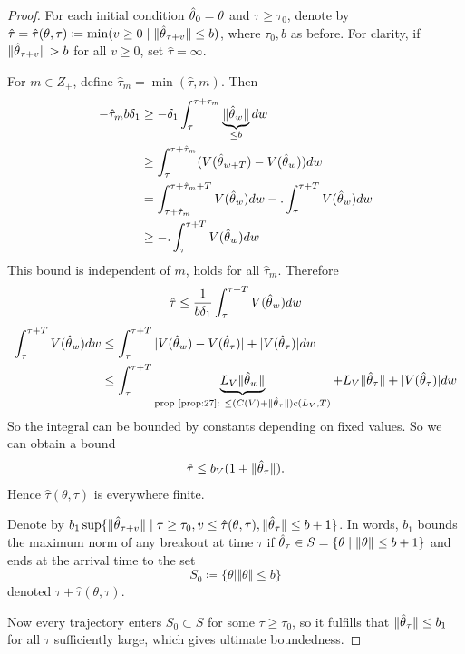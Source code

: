 \begin{proof}
    For each initial condition \({\hat{\theta}}_0=\theta\) and \(\tau\geq \tau_0\), denote by 
    \(\hat{\tau}=\hat{\tau}(\theta,\tau)\coloneqq \min(v\geq 0\mid \Vert {\hat{\theta}}_{\tau+v}\Vert \leq b)\),
    where \(\tau_0,b\) as before. For clarity, if \(\Vert{\hat{\theta}}_{\tau+v}\Vert>b\)
    for all \(v\geq 0\), set \(\hat{\tau}=\infty\).

    For \(m\in Z_+\), define \(\hat{\tau}_m=\min(\hat{\tau},m)\). Then 
    \begin{align*}
        -\hat{\tau}_m b\delta_1&\geq -\delta_1\int_\tau^{\tau+\tau_m}\underbrace{\Vert {\hat{\theta}}_w\Vert}_{\leq b} dw\\
        &\geq \int_\tau^{\tau+\hat{\tau}_m}(V({\hat{\theta}}_{w+T})-V({\hat{\theta}}_w))dw \\
        &=\int_{\tau+\hat{\tau}_m}^{\tau+\hat{\tau}_m+T}V({\hat{\theta}}_w)dw-.\int_\tau^{\tau+T} V({\hat{\theta}}_w)dw\\
        &\geq -.\int_\tau^{\tau+T} V({\hat{\theta}}_w)dw
    \end{align*}
    This bound is independent of \(m\), holds for all \(\hat{\tau}_m\). Therefore 
    \begin{align*}
        \hat{\tau}\leq \frac{1}{b\delta_1}\int_\tau^{\tau+T} V({\hat{\theta}}_w)dw
    \end{align*}
    \begin{align*}
        \int_\tau^{\tau+T} V({\hat{\theta}}_w)dw&\leq\int_\tau^{\tau+T}\vert V({\hat{\theta}}_w)-V({\hat{\theta}}_\tau)\vert +\vert V({\hat{\theta}}_\tau)\vert dw\\
        &\leq \int_{\tau}^{\tau+T}\underbrace{L_V\Vert {\hat{\theta}}_w\Vert}_{\text{prop \ref{prop:27}: }\leq (C(V)+\Vert {\hat{\theta}}_\tau\Vert)c(L_V,T)} + L_V\Vert {\hat{\theta}}_\tau\Vert + \vert V({\hat{\theta}}_\tau)\vert dw 
    \end{align*}
    So the integral can be bounded by constants depending on fixed values. So we can obtain a bound 
    \begin{align*}
        \hat{\tau}\leq b_V (1+\Vert {\hat{\theta}}_\tau\Vert).
    \end{align*}
    Hence \(\hat{\tau}(\theta,\tau)\) is everywhere finite. 

    Denote by \(b_1\sup \{\Vert {\hat{\theta}}_{\tau+v}\Vert\mid \tau \geq \tau_0,v\leq \hat{\tau}(\theta,\tau),\Vert {\hat{\theta}}_\tau\Vert\leq b+1\}\).
    In words, \(b_1\) bounds the maximum norm of any breakout %
    at time \(\tau\) if \({\hat{\theta}}_\tau\in S=\{\theta\mid \Vert \theta\Vert\leq b+1\}\)
    and ends at the arrival time to the set 
    \[S_0\coloneqq \{\theta\mid \Vert \theta\Vert \leq b\}\] 
    denoted \(\tau+\hat{\tau}(\theta,\tau)\).

    Now every trajectory enters \(S_0\subset S\) for some \(\tau\geq \tau_0\), so 
    it fulfills that \(\Vert{\hat{\theta}}_\tau\Vert\leq b_1\) for all \(\tau\) sufficiently large,
    which gives ultimate boundedness.
\end{proof}

